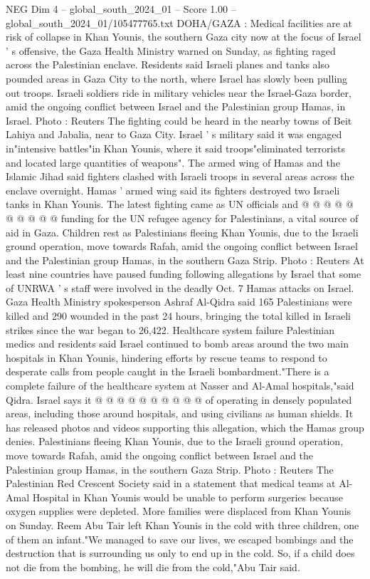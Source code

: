 \begin{textsample}{NEG Dim 4 – global\_south\_2024\_01 – Score 1.00 – global\_south\_2024\_01/105477765.txt}  \label{ex:f4_neg_090}
DOHA/GAZA : Medical facilities are at risk of collapse in Khan Younis, the southern Gaza city now at the focus of Israel ' s offensive, the Gaza Health Ministry warned on Sunday, as fighting raged across the Palestinian enclave.
Residents said Israeli planes and tanks also pounded areas in Gaza City to the north, where Israel has slowly been pulling out troops.
Israeli soldiers ride in military vehicles near the Israel-Gaza border, amid the ongoing conflict between Israel and the Palestinian group Hamas, in Israel.
Photo : Reuters The fighting could be heard in the nearby towns of Beit Lahiya and Jabalia, near to Gaza City.
Israel ' s military said it was engaged in"intensive battles"in Khan Younis, where it said troops"eliminated terrorists and located large quantities of weapons".
The armed wing of Hamas and the Islamic Jihad said fighters clashed with Israeli troops in several areas across the enclave overnight.
Hamas ' armed wing said its fighters destroyed two Israeli tanks in Khan Younis.
The latest fighting came as UN officials and @ @ @ @ @ @ @ @ @ @ funding for the UN refugee agency for Palestinians, a vital source of aid in Gaza.
Children rest as Palestinians fleeing Khan Younis, due to the Israeli ground operation, move towards Rafah, amid the ongoing conflict between Israel and the Palestinian group Hamas, in the southern Gaza Strip.
Photo : Reuters At least nine countries have paused funding following allegations by Israel that some of UNRWA ' s staff were involved in the deadly Oct. 7 Hamas attacks on Israel.
Gaza Health Ministry spokesperson Ashraf Al-Qidra said 165 Palestinians were killed and 290 wounded in the past 24 hours, bringing the total killed in Israeli strikes since the war began to 26,422.
Healthcare system failure Palestinian medics and residents said Israel continued to bomb areas around the two main hospitals in Khan Younis, hindering efforts by rescue teams to respond to desperate calls from people caught in the Israeli bombardment."There is a complete failure of the healthcare system at Nasser and Al-Amal hospitals,"said Qidra.
Israel says it @ @ @ @ @ @ @ @ @ @ of operating in densely populated areas, including those around hospitals, and using civilians as human shields.
It has released photos and videos supporting this allegation, which the Hamas group denies.
Palestinians fleeing Khan Younis, due to the Israeli ground operation, move towards Rafah, amid the ongoing conflict between Israel and the Palestinian group Hamas, in the southern Gaza Strip.
Photo : Reuters The Palestinian Red Crescent Society said in a statement that medical teams at Al-Amal Hospital in Khan Younis would be unable to perform surgeries because oxygen supplies were depleted.
More families were displaced from Khan Younis on Sunday.
Reem Abu Tair left Khan Younis in the cold with three children, one of them an infant."We managed to save our lives, we escaped bombings and the destruction that is surrounding us only to end up in the cold.
So, if a child does not die from the bombing, he will die from the cold,"Abu Tair said.

\end{textsample}
